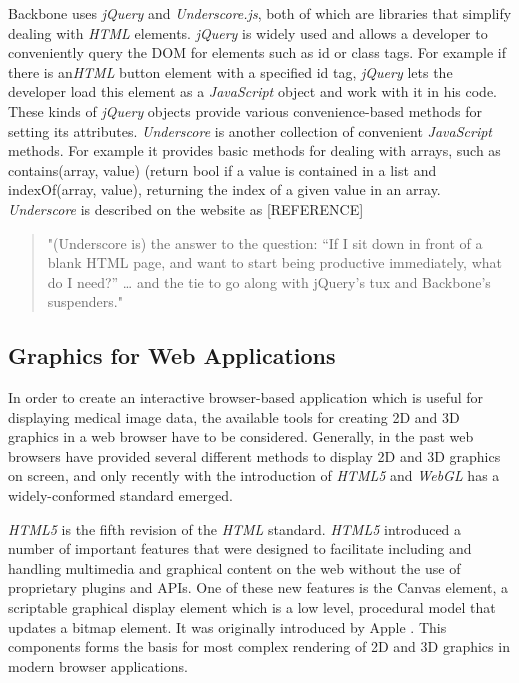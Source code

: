 \documentclass[a4paper,11pt,twoside]{article}
\begin{document}
Backbone uses \textit{jQuery} and \textit{Underscore.js}, both of which are libraries that simplify dealing with \textit{HTML} elements. \textit{jQuery} is widely used and allows a developer to conveniently query the DOM for elements such as id or class tags. For example if there is an\textit{HTML} button element with a specified id tag, \textit{jQuery} lets the developer load this element as a \textit{JavaScript} object and work with it in his code. These kinds of \textit{jQuery} objects provide various convenience-based methods for setting its attributes. \textit{Underscore}  is another collection of convenient \textit{JavaScript} methods. For example it provides basic methods for dealing with arrays, such as contains(array, value) (return bool if a value is contained in a list and indexOf(array, value), returning the index of a given value in an array. \textit{Underscore} is described on the website as [REFERENCE]

\begin{quotation}
"(Underscore is) the answer to the question: “If I sit down in front of a blank 
HTML page, and want to start being productive immediately, what do I need?” … 
and the tie to go along with jQuery's tux and Backbone's suspenders."
\end{quotation}


\subsection{Graphics for Web Applications}

In order to create an interactive browser-based application which is useful for displaying medical image data, the available tools for creating 2D and 3D graphics in a web browser have to be considered. Generally, in the past web browsers have provided several different methods to display 2D and 3D graphics on screen, and only recently with the introduction of \textit{HTML5} and \textit{WebGL} has a widely-conformed standard emerged.

\textit{HTML5} is the fifth revision of the \textit{HTML} standard. \textit{HTML5} introduced a number of important features that were designed to facilitate including and handling multimedia and graphical content on the web without the use of proprietary plugins and APIs. One of these new features is the Canvas element, a scriptable graphical display element which is a low level, procedural model that updates a bitmap element. It was originally introduced by Apple \cite{canvas} . This components forms the basis for most complex rendering of 2D and 3D graphics in modern browser applications.
\end{document}

